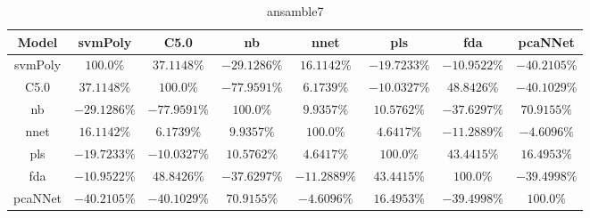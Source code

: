 \begin{table}[!ht]
	\centering
	\begin{tabular}{|c|c|c|c|c|c|c|c|}
		\hline
		Model & svmPoly & C5.0 & nb & nnet & pls & fda & pcaNNet \\ \hline
		svmPoly & $100.0\%$ & $37.1148\%$ & $-29.1286\%$ & $16.1142\%$ & $-19.7233\%$ & $-10.9522\%$ & $-40.2105\%$ \\ \hline
		C5.0 & $37.1148\%$ & $100.0\%$ & $-77.9591\%$ & $6.1739\%$ & $-10.0327\%$ & $48.8426\%$ & $-40.1029\%$ \\ \hline
		nb & $-29.1286\%$ & $-77.9591\%$ & $100.0\%$ & $9.9357\%$ & $10.5762\%$ & $-37.6297\%$ & $70.9155\%$ \\ \hline
		nnet & $16.1142\%$ & $6.1739\%$ & $9.9357\%$ & $100.0\%$ & $4.6417\%$ & $-11.2889\%$ & $-4.6096\%$ \\ \hline
		pls & $-19.7233\%$ & $-10.0327\%$ & $10.5762\%$ & $4.6417\%$ & $100.0\%$ & $43.4415\%$ & $16.4953\%$ \\ \hline
		fda & $-10.9522\%$ & $48.8426\%$ & $-37.6297\%$ & $-11.2889\%$ & $43.4415\%$ & $100.0\%$ & $-39.4998\%$ \\ \hline
		pcaNNet & $-40.2105\%$ & $-40.1029\%$ & $70.9155\%$ & $-4.6096\%$ & $16.4953\%$ & $-39.4998\%$ & $100.0\%$ \\ \hline
	\end{tabular}
	\caption{ansamble7}
	\label{tab:ansamble7}
\end{table}

